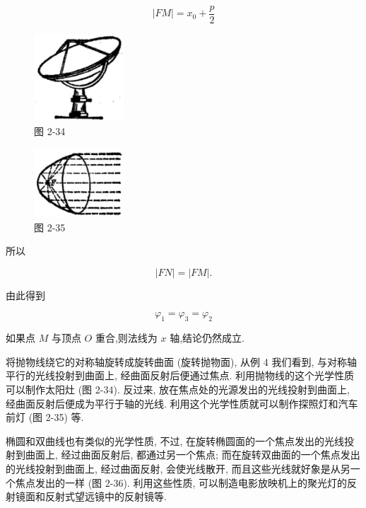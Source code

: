 \documentclass[lang=cn,newtx,10.5pt,scheme=chinese]{elegantbook}
\begin{document}
\[
  \left| {FM}\right| = {x}_{0} + \frac{p}{2}
\]

\begin{figure}[h]
  \centering
  \includegraphics[max width=0.3\textwidth]{images/01912cc2-ffb6-728e-9ae7-b113ff05c64b_123_742628.jpg}
  \caption{图 2-34}
\end{figure}



\begin{figure}[h]
  \centering
  \includegraphics[max width=0.3\textwidth]{images/01912cc2-ffb6-728e-9ae7-b113ff05c64b_123_478254.jpg}
  \caption{图 2-35}
\end{figure}



所以

\[
  \left| {FN}\right| = \left| {FM}\right| \text{.}
\]

由此得到

\[
    {\varphi }_{1} = {\varphi }_{3} = {\varphi }_{2}
\]

如果点 \(M\) 与顶点 \(O\) 重合,则法线为 \(x\) 轴,结论仍然成立.

将抛物线绕它的对称轴旋转成旋转曲面 (旋转抛物面), 从例 4 我们看到, 与对称轴平行的光线投射到曲面上, 经曲面反射后便通过焦点. 利用抛物线的这个光学性质可以制作太阳灶 (图 2-34). 反过来, 放在焦点处的光源发出的光线投射到曲面上, 经曲面反射后便成为平行于轴的光线. 利用这个光学性质就可以制作探照灯和汽车前灯 (图 2-35) 等.

椭圆和双曲线也有类似的光学性质, 不过, 在旋转椭圆面的一个焦点发出的光线投射到曲面上, 经过曲面反射后, 都通过另一个焦点; 而在旋转双曲面的一个焦点发出的光线投射到曲面上, 经过曲面反射, 会使光线散开, 而且这些光线就好象是从另一个焦点发出的一样 (图 2-36). 利用这些性质, 可以制造电影放映机上的聚光灯的反射镜面和反射式望远镜中的反射镜等.
\end{document}
